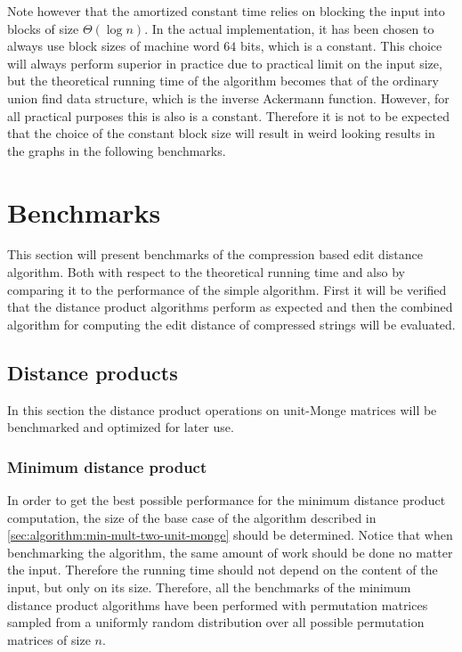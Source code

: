 \documentclass[twoside,11pt,openright]{report}
\begin{document}
 Note however that the amortized constant time relies on blocking the input into blocks of size $\Theta(\log{n})$. In the actual implementation, it has been chosen to always use block sizes of machine word $64$ bits, which is a constant. This choice will always perform superior in practice due to practical limit on the input size, but the theoretical running time of the algorithm becomes that of the ordinary union find data structure, which is the inverse Ackermann function. However, for all practical purposes this is also is a constant. Therefore it is not to be expected that the choice of the constant block size will result in weird looking results in the graphs in the following benchmarks.

\clearpage
\section{Benchmarks}
\label{sec:algorithm:benchmarks}
This section will present benchmarks of the compression based edit distance algorithm. Both with respect to the theoretical running time and also by comparing it to the performance of the simple algorithm. First it will be verified that the distance product algorithms perform as expected and then the combined algorithm for computing the edit distance of compressed strings will be evaluated.

\subsection{Distance products}
In this section the distance product operations on unit-Monge matrices will be benchmarked and optimized for later use.

\subsubsection{Minimum distance product}
\label{sec:min-dist-mult-bc}
In order to get the best possible performance for the minimum distance product computation, the size of the base case of the algorithm described in \cref{sec:algorithm:min-mult-two-unit-monge} should be determined. Notice that when benchmarking the algorithm, the same amount of work should be done no matter the input. Therefore the running time should not depend on the content of the input, but only on its size. Therefore, all the benchmarks of the minimum distance product algorithms have been performed with permutation matrices sampled from a uniformly random distribution over all possible permutation matrices of size $n$.
\end{document}
